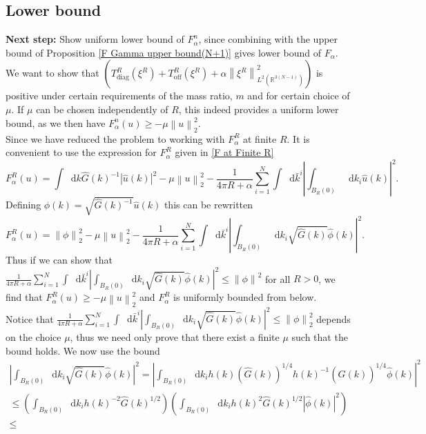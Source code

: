 \documentclass[a4paper,11pt]{article}
\newcommand{\norm}[1]{\left\lVert #1 \right\rVert}
\newcommand{\abs}[1]{\left\lvert #1 \right\rvert}
\newcommand*\diff{\mathop{}\!\mathrm{d}}
\newcommand{\R}{\mathbb{R}}
\numberwithin{equation}{section}
\begin{document}
\subsection*{Lower bound}
	\textbf{Next step:}
Show uniform lower bound of $ F^n_\alpha $, since combining with the upper bound of Proposition \ref{F Gamma upper bound(N+1)} gives lower bound of $ F_\alpha $. We want to show that $ \left(T^R_{\text{diag}}(\xi^R)+T^R_{\text{off}}(\xi^R)+\alpha\norm{\xi^R}_{L^2(\R^{3(N-1)})}^2\right) $ is positive under certain requirements of the mass ratio, $ m $ and for certain choice of $ \mu $. If $ \mu $ can be chosen independently of $ R $, this indeed provides a uniform lower bound, as we then have $ F_\alpha^n(u)\geq-\mu\norm{u}_2^2 $.\\
Since we have reduced the problem to working with $ F^R_\alpha $ at finite $ R $. It is convenient to use the expression for $ F_\alpha^R $ given in \eqref{F at Finite R}
\begin{equation}
F_\alpha^R(u)=\int\diff k \hat{G}(k)^{-1}\abs{\hat{u}(k)}^2-\mu\norm{u}_2^2-\frac{1}{4\pi R+\alpha}\sum_{i=1}^{N}\int\diff\bar{k}^i\left\lvert\int_{B_R(0)}\diff k_i\hat{u}(k)\right\rvert^2.
\end{equation}
Defining $ \hat{\phi}(k)=\sqrt{\hat{G}(k)^{-1}}\hat{u}(k) $ this can be rewritten\begin{equation}
F_\alpha^R(u)=\norm{\phi}_2^2-\mu\norm{u}_2^2-\frac{1}{4\pi R+\alpha}\sum_{i=1}^{N}\int\diff\bar{k}^i\left\lvert\int_{B_R(0)}\diff k_i\sqrt{\hat{G}(k)}\hat{\phi}(k)\right\rvert^2.
\end{equation}
Thus if we can show that $ \frac{1}{4\pi R+\alpha}\sum_{i=1}^{N}\int\diff\bar{k}^i\left\lvert\int_{B_R(0)}\diff k_i\sqrt{\hat{G}(k)}\hat{\phi}(k)\right\rvert^2\leq\norm{\phi}^2 $ for all $ R>0 $, we find that $ F_\alpha^R(u)\geq-\mu\norm{u}_2^2 $ and $ F_\alpha^R $ is uniformly bounded from below. \\Notice that $ \frac{1}{4\pi R+\alpha}\sum_{i=1}^{N}\int\diff\bar{k}^i\left\lvert\int_{B_R(0)}\diff k_i\sqrt{\hat{G}(k)}\hat{\phi}(k)\right\rvert^2\leq\norm{\phi}_2^2$ depends on the choice $ \mu $, thus we need only prove that there exist a finite $ \mu $ such that the bound holds. We now use the bound \begin{equation}
\begin{aligned}
\left\lvert\int_{B_R(0)}\diff k_i\sqrt{\hat{G}(k)}\hat{\phi}(k)\right\rvert^2=\left\lvert\int_{B_R(0)}\diff k_ih(k)\left(\hat{G}(k)\right)^{1/4}h(k)^{-1}\left(\hat{G}(k)\right)^{1/4}\hat{\phi}(k)\right\rvert^2\\
\leq \left(\int_{B_R(0)}\diff k_ih(k)^{-2}\hat{G}(k)^{1/2}\right)\left(\int_{B_R(0)}\diff k_i h(k)^{2}\hat{G}(k)^{1/2}\abs{\hat{\phi}(k)}^2\right)\\
\leq 
\end{aligned}
\end{equation}
\end{document}
